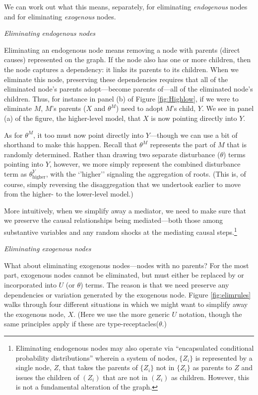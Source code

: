 \documentclass[12pt,]{book}
\let\rmarkdownfootnote\footnote%
\def\footnote{\protect\rmarkdownfootnote}
\begin{document}
We can work out what this means, separately, for eliminating \emph{endogenous} nodes and for eliminating \emph{exogenous} nodes.

\emph{Eliminating endogenous nodes}

Eliminating an endogenous node means removing a node with parents (direct causes) represented on the graph. If the node also has one or more children, then the node captures a dependency: it links its parents to its children. When we eliminate this node, preserving these dependencies requires that all of the eliminated node's parents adopt---become parents of---all of the eliminated node's children. Thus, for instance in panel (b) of Figure \ref{fig:Highlow}, if we were to eliminate \(M\), \(M\)'s parents (\(X\) and \(\theta^M\)) need to adopt \(M\)'s child, \(Y\). We see in panel (a) of the figure, the higher-level model, that \(X\) is now pointing directly into \(Y\).

As for \(\theta^M\), it too must now point directly into \(Y\)---though we can use a bit of shorthand to make this happen. Recall that \(\theta^M\) represents the part of \(M\) that is randomly determined. Rather than drawing two separate disturbance (\(\theta\)) terms pointing into \(Y\), however, we more simply represent the combined disturbance term as \(\theta^Y_{\text{higher}}\), with the `'higher'' signaling the aggregation of roots. (This is, of course, simply reversing the disaggregation that we undertook earlier to move from the higher- to the lower-level model.)

More intuitively, when we simplify away a mediator, we need to make sure that we preserve the causal relationships being mediated---both those among substantive variables and any random shocks at the mediating causal steps.\footnote{Eliminating endogenous nodes may also operate via ``encapsulated conditional probability distributions'' \citep{koller2009probabilistic} wherein a system of nodes, \(\{Z_i\}\) is represented by a single node, \(Z\), that takes the parents of \(\{Z_i\}\) not in \(\{Z_i\}\) as parents to \(Z\) and issues the children of \((Z_i)\) that are not in \((Z_i)\) as children. However, this is not a fundamental alteration of the graph.}

\emph{Eliminating exogenous nodes}

What about eliminating exogenous nodes---nodes with no parents? For the most part, exogenous nodes cannot be eliminated, but must either be replaced by or incorporated into \(U\) (or \(\theta\)) terms. The reason is that we need preserve any dependencies or variation generated by the exogenous node. Figure \ref{fig:elimrules} walks through four different situations in which we might want to simplify away the exogenous node, \(X\). (Here we use the more generic \(U\) notation, though the same principles apply if these are type-receptacles(\(\theta\).)
\end{document}
